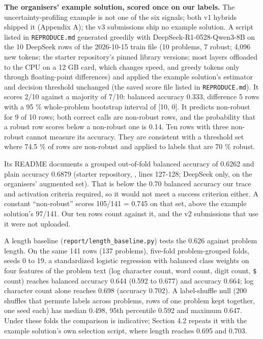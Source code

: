 \documentclass{article}
\begin{document}
\textbf{The organisers' example solution, scored once on our labels.} The uncertainty-profiling example is not
one of the six signals; both v1 hybrids shipped it (Appendix A); the v3 submissions ship no example solution. A script listed in \texttt{REPRODUCE.md} generated
greedily with DeepSeek-R1-0528-Qwen3-8B on the 10 DeepSeek rows of the 2026-10-15 train file (10
problems, 7 robust; 4,096 new tokens; the starter repository's pinned library versions; most layers offloaded to the
CPU on a 12 GB card, which changes speed, and greedy tokens only through floating-point differences)
and applied the example solution's estimator and decision threshold unchanged (the saved score file listed in \texttt{REPRODUCE.md}).
It scores 2/10 against a majority of 7/10: balanced accuracy 0.333, difference \textminus{}5 rows with a 95 \%
whole-problem bootstrap interval of {[}\textminus{}10, 0{]}. It predicts non-robust for 9 of 10 rows; both correct
calls are non-robust rows, and the probability that a robust row scores below a non-robust one is
0.14. Ten rows with three non-robust cannot measure its accuracy. They are consistent with a
threshold set where 74.5 \% of rows are non-robust and applied to labels that are 70 \% robust.

Its README documents a grouped out-of-fold balanced accuracy of 0.6262 and plain accuracy 0.6879
(starter repository, , lines 127-128; DeepSeek only, on the organisers'
augmented set). That is below the 0.70 balanced accuracy our trace and activation criteria required, so it would not
meet a success criterion either. A constant ``non-robust'' scores 105/141 = 0.745 on that set, above the
example solution's 97/141. Our ten rows count against it, and the v2 submissions that use it were not uploaded.

A length baseline (\texttt{report/length\_baseline.py}) tests the 0.626 against problem length. On the
same 141 rows (137 problems), five-fold problem-grouped folds, seeds 0 to 19, a standardized
logistic regression with balanced class weights on four features of the problem text (log
character count, word count, digit count, \texttt{\$} count) reaches balanced accuracy 0.644 (0.592 to
0.677) and accuracy 0.664; log character count alone reaches 0.698 (accuracy 0.702). A
label-shuffle null (200 shuffles that permute labels across problems, rows of one problem kept
together, one seed each) has median 0.498, 95th percentile 0.592 and maximum 0.647. Under these folds the comparison is indicative; Section 4.2 repeats it with the example solution's own selection script, where length reaches 0.695 and 0.703.
\end{document}
